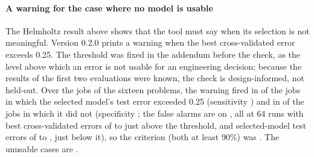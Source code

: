 \paragraph{A warning for the case where no model is usable} The Helmholtz result above shows that the tool must say when its selection is not meaningful. Version 0.2.0 prints a warning when the best cross-validated error exceeds 0.25. The threshold was fixed in the addendum before the check, as the level above which an error is not usable for an engineering decision; because the results of the first two evaluations were known, the check is design-informed, not held-out. Over the \SuN{} jobs of the sixteen problems, the warning fired in \SuTp{} of the \SuUnusableJobs{} jobs in which the selected model's test error exceeded 0.25 (sensitivity \SuSens) and in \SuFp{} of the \SuUsableJobs{} jobs in which it did not (specificity \SuSpec; the false alarms are on \SuFpInst, all at 64 runs with best cross-validated errors of \SuFpCvMin{} to \SuFpCvMax{} just above the threshold, and selected-model test errors of \SuFpTestMin{} to \SuFpTestMax{}, just below it), so the criterion (both at least 90\%) was \SuVerdict. The unusable cases are \SuUnusable.
